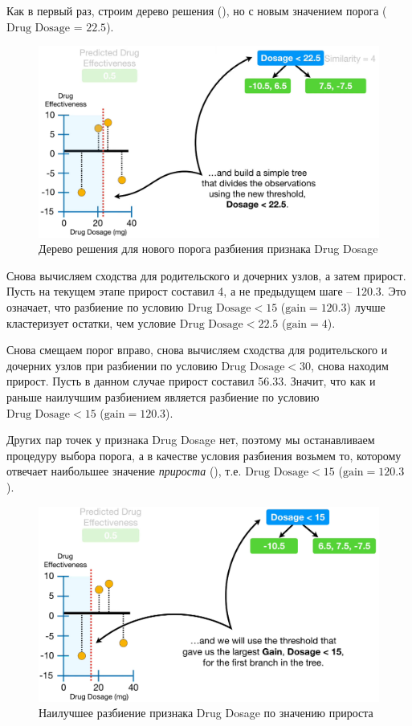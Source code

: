 \documentclass[%
	11pt,
	a4paper,
	utf8,
		]{article}
\begin{document}
Как в первый раз, строим дерево решения (), но с новым значением порога ($ \text{Drug Dosage = 22.5} $).

\begin{figure}[h]
	\centering
	\includegraphics[scale=0.4]{figures/xgboost_split2.png}
	\caption{ Дерево решения для нового порога разбиения признака Drug Dosage }\label{fig:xgboost_split2}
\end{figure}

Снова вычисляем сходства для родительского и дочерних узлов, а затем прирост. Пусть на текущем этапе прирост составил 4, а не предыдущем шаге -- 120.3. Это означает, что разбиение по условию $ \text{Drug Dosage} < 15 $ ($ \text{gain} = 120.3 $) лучше кластеризует остатки, чем условие $ \text{Drug Dosage} < 22.5 $ ($ \text{gain} = 4 $).

Снова смещаем порог вправо, снова вычисляем сходства для родительского и дочерних узлов при разбиении по условию $ \text{Drug Dosage} < 30 $, снова находим прирост. Пусть в данном случае прирост составил 56.33. Значит, что как и раньше наилучшим разбиением является разбиение по условию $ \text{Drug Dosage} < 15 $ ($ \text{gain} = 120.3 $). 

Других пар точек у признака Drug Dosage нет, поэтому мы останавливаем процедуру выбора порога, а в качестве условия разбиения возьмем то, которому отвечает наибольшее значение \emph{прироста} (), т.е. $ \text{Drug Dosage} < 15 $ ($ \text{gain} = 120.3 $).

\begin{figure}[h]
	\centering
	\includegraphics[scale=0.35]{figures/xgboost_best_gain1.png}
	\caption{ Наилучшее разбиение признака Drug Dosage по значению прироста }\label{fig:xgboost_best_gain1}
\end{figure}
\end{document}
